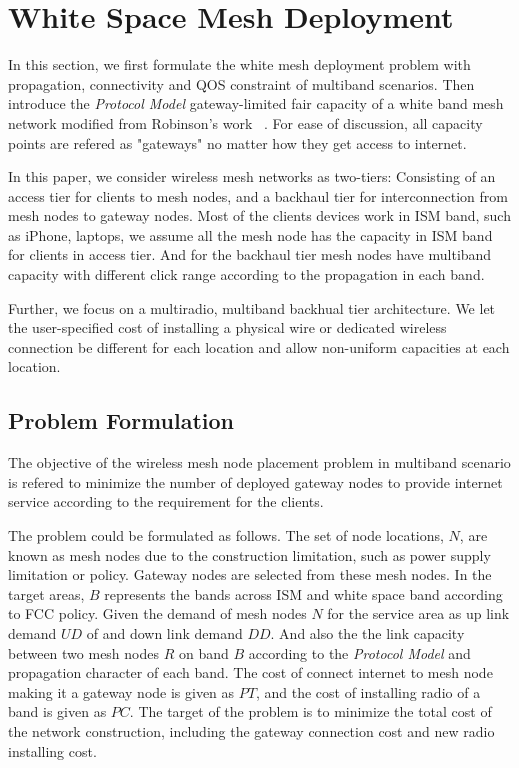 \section{White Space Mesh Deployment}
\label{sec:model}

In this section, we first formulate the 
white mesh deployment problem
with propagation, connectivity and QOS constraint of multiband scenarios.
Then introduce the \emph{Protocol Model} gateway-limited fair capacity of a white band mesh network modified from Robinson's work ~\cite{robinson2008adding}. 
For ease of discussion, all capacity points are refered as "gateways" no matter how they get access to internet.

In this paper, we consider wireless mesh networks as two-tiers:
Consisting of an access tier for clients to mesh nodes, and a backhaul tier for interconnection from mesh nodes to gateway nodes. 
Most of the clients devices work in ISM band, such as iPhone, laptops, we assume all the mesh node has the capacity in ISM band for clients in access tier. And for the backhaul tier mesh nodes have multiband capacity with different click range according to the propagation in each band.

Further, we focus on a multiradio, multiband backhual tier architecture. We let the user-specified cost of installing a physical wire or dedicated wireless connection be different for each location and allow non-uniform capacities at each location.
 
\subsection{Problem Formulation}
The objective of the wireless mesh node placement problem in multiband scenario is refered to
minimize the number of deployed gateway nodes to provide internet service according to the requirement for the clients. 

The problem could be formulated as follows.
The set of node locations, $N$, are known as mesh nodes due to the construction limitation, such as power supply limitation or policy. Gateway nodes are selected from these mesh nodes.
In the target areas, $B$ represents the bands across ISM and white space band according to FCC policy.
Given the demand of mesh nodes $N$ for the service area as up link demand $UD$ of and down link demand $DD$. And also the the link capacity between two mesh nodes $R$ on band $B$ according to the \emph{Protocol Model} and propagation character of each band.
The cost of connect internet to mesh node making it a gateway node is given as $PT$, and the cost of installing radio of a band is given as $PC$.
The target of the problem is to minimize the total cost of the network construction, including the gateway connection cost and new radio installing cost.

